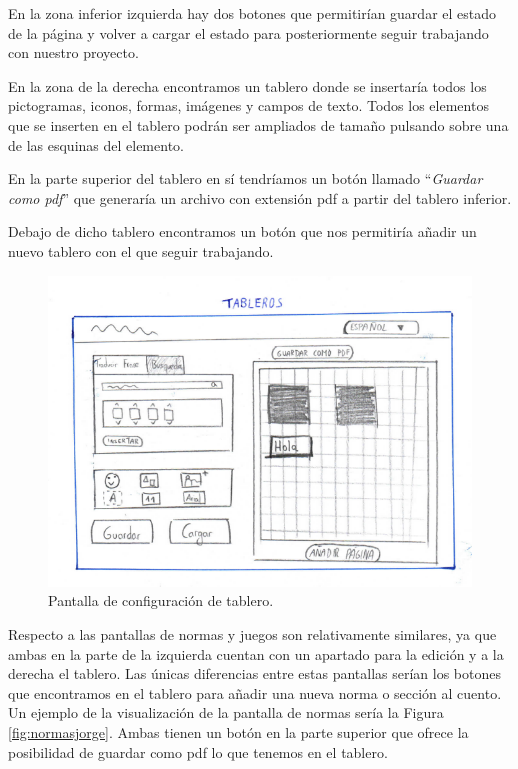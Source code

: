 	
	En la zona inferior izquierda hay dos botones que permitirían guardar el estado de la página y volver a cargar el estado para posteriormente seguir trabajando con nuestro proyecto.
	
	
	En la zona de la derecha encontramos un tablero donde se insertaría todos los pictogramas, iconos, formas, imágenes y campos de texto. Todos los elementos que se inserten en el tablero podrán ser ampliados de tamaño pulsando sobre una de las esquinas del elemento.
	
	En la parte superior del tablero en sí tendríamos un botón llamado “\textit{Guardar como pdf}” que generaría un archivo con extensión pdf a partir del tablero inferior.
	
	Debajo de dicho tablero encontramos un botón que nos permitiría añadir un nuevo tablero con el que seguir trabajando.
	
	
	
	\begin{figure}[h!]
		\centering
		\includegraphics[width=0.7\linewidth]{Imagenes/Bitmap/tablerosJorge}
		\caption{Pantalla de configuración de tablero.}
		\label{fig:tablerosjorge}
	\end{figure}
	
	
	

	Respecto a las pantallas de normas y juegos son relativamente similares, ya que ambas en la parte de la izquierda cuentan con un apartado para la edición y a la derecha el tablero. Las únicas diferencias entre estas pantallas serían los botones que encontramos en el tablero para añadir una nueva norma o sección al cuento. Un ejemplo de la visualización de la pantalla de normas sería la Figura \ref{fig:normasjorge}. Ambas tienen un botón en la parte superior que ofrece la posibilidad de guardar como pdf lo que tenemos en el tablero.
	
